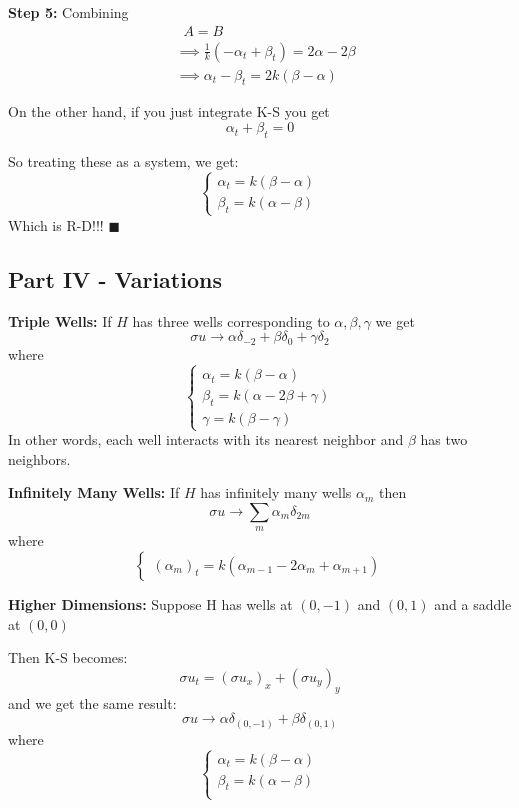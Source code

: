 \documentclass[12pt]{article}
\begin{document}
\textbf{Step 5:} Combining 
\begin{align*}
    &\;\;A = B\\
    &\implies \frac{1}{k}(-\alpha_t + \beta_t) = 2\alpha - 2\beta\\
    &\implies \alpha_t - \beta_t = 2k(\beta - \alpha)
\end{align*}

On the other hand, if you just integrate K-S you get 
\[\alpha_t + \beta_t = 0\]

So treating these as a system, we get:
\[\begin{cases}
    \alpha_t = k(\beta - \alpha)\\
    \beta_t = k(\alpha - \beta)
\end{cases}\]
Which is R-D!!! $\blacksquare$

\subsection*{Part IV - Variations}
\textbf{Triple Wells:} If $H$ has three wells corresponding to $\alpha, \beta, \gamma$ we get 
\[\sigma u \to \alpha \delta_{-2} + \beta \delta_0 + \gamma \delta_{2}\]
where
\[\begin{cases}
    \alpha_t = k(\beta - \alpha)\\
    \beta_t = k(\alpha - 2\beta + \gamma)\\
    \gamma = k(\beta - \gamma)
\end{cases}\]
In other words, each well interacts with its nearest neighbor and $\beta$ has two neighbors.

\textbf{Infinitely Many Wells:} If $H$ has infinitely many wells $\alpha_m$ then 
\[\sigma u \to \sum_m \alpha_m \delta_{2m}\]
where 
\[\begin{cases}
    (\alpha_m)_t = k(\alpha_{m-1} - 2\alpha_m + \alpha_{m+1})
\end{cases}\]

\textbf{Higher Dimensions:} Suppose H has wells at $(0, -1)$ and $(0, 1)$ and a saddle at $(0, 0)$

Then K-S becomes:
\[\sigma u_t = (\sigma u_x)_x + (\sigma u_y)_y\]
and we get the same result:
\[\sigma u \to \alpha \delta_{(0, -1)} + \beta \delta_{(0, 1)}\]
where
\[\begin{cases}
    \alpha_t = k(\beta - \alpha)\\
    \beta_t = k(\alpha - \beta)\\
\end{cases}\]
\end{document}
